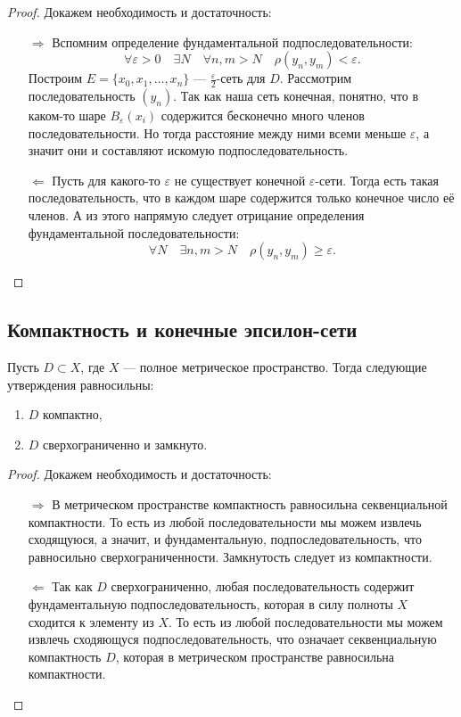 \begin{proof}
	Докажем необходимость и достаточность:
	\begin{enumerate}
		\item[\(\Rightarrow\)] Вспомним определение фундаментальной подпоследовательности: \[
		\forall \varepsilon > 0 \quad \exists N \quad \forall n, m > N \quad \rho(y_{n}, y_{m}) < \varepsilon.
		\]
		Построим \(E = \{x_0, x_1,\ldots, x_n\}\) ---  \(\frac{\varepsilon}{2}\)-сеть для \(D\). Рассмотрим последовательность \((y_n)\). Так как наша сеть конечная, понятно, что в каком-то шаре \(B_\varepsilon (x_i)\) содержится бесконечно много членов последовательности. Но тогда расстояние между ними всеми меньше \(\varepsilon\), а значит они и составляют искомую подпоследовательность.
		\item[\(\Leftarrow\)] Пусть для какого-то \(\varepsilon\) не существует конечной \(\varepsilon\)-сети. Тогда есть такая последовательность, что в каждом шаре содержится только конечное число её членов. А из этого напрямую следует отрицание определения фундаментальной последовательности: \[
		\forall N \quad \exists n, m > N \quad \rho(y_{n}, y_{m}) \geqslant \varepsilon.
		\]
	\end{enumerate}
\end{proof}

\subsection{Компактность и конечные эпсилон-сети}

\begin{theorem}
	Пусть \(D \subset X\), где \(X\) --- полное метрическое пространство. Тогда следующие утверждения равносильны:
	\begin{enumerate}
		\item \(D\) компактно,
		\item \(D\) сверхограниченно и замкнуто.
	\end{enumerate}
\end{theorem}

\begin{proof}
	Докажем необходимость и достаточность:
	\begin{enumerate}
		\item[\(\Rightarrow\)] В метрическом пространстве компактность равносильна секвенциальной компактности. То есть из любой последовательности мы можем извлечь сходящуюся, а значит, и фундаментальную, подпоследовательность, что равносильно сверхограниченности. Замкнутость следует из компактности.
		\item[\(\Leftarrow\)] Так как \(D\) сверхограниченно, любая последовательность содержит фундаментальную подпоследовательность, которая в силу полноты \(X\) сходится к элементу из \(X\). То есть из любой последовательности мы можем извлечь сходяющуся подпоследовательность, что означает секвенциальную компактность \(D\), которая в метрическом пространстве равносильна компактности.
	\end{enumerate}
\end{proof}

